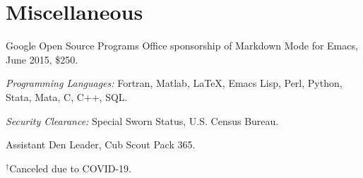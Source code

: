\documentclass[10pt,letterpaper]{article}
\renewenvironment{itemize}{
  \begin{list}{}{
      \setlength{\leftmargin}{1.5em}
      \setlength{\itemsep}{0.25em}
      \setlength{\parskip}{0pt}
      \setlength{\parsep}{0.25em}
    }
}{
  \end{list}
}
\newcommand{\fncovid}{{\footnotesize ${}^{\dagger}$}}
\begin{document}
\section*{Miscellaneous}

\begin{itemize}
\item Google Open Source Programs Office sponsorship of Markdown Mode for Emacs, June 2015, \$250.
\item \textit{Programming Languages:} Fortran, Matlab, \LaTeX, Emacs Lisp, Perl, Python, Stata, Mata, C, C++, SQL.
\item \textit{Security Clearance:} Special Sworn Status, U.S. Census Bureau.
\item Assistant Den Leader, Cub Scout Pack 365.
\end{itemize}

\vfill

{\footnotesize \fncovid Canceled due to COVID-19.}
\end{document}
